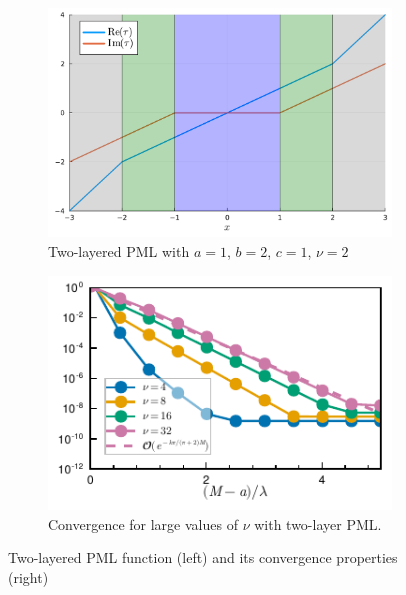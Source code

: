 \documentclass[review,hidelinks,onefignum,onetabnum]{siamart220329}
\begin{document}
\begin{figure}[ht]
  \centering
  \begin{subfigure}{0.49\linewidth}
    \includegraphics[width=\textwidth]{pml_real_and_imag.pdf}
    \caption{Two-layered PML with $a=1$, $b=2$, $c=1$, $\nu=2$}
    \label{fig:two-layer-pml}
  \end{subfigure}\hfill
  \begin{subfigure}{0.49\linewidth}
    \includegraphics[width=1\textwidth]{convergence_pml_stretch_planewave_vary_depth.pdf}
    \caption{Convergence for large values of $\nu$ with two-layer PML.}
    \label{fig:convergence-stretching-vary-depth}
  \end{subfigure}
  \label{fig:convergence-modal-solution}
  \caption{Two-layered PML function (left) and its convergence properties (right)}
\end{figure}
\end{document}
